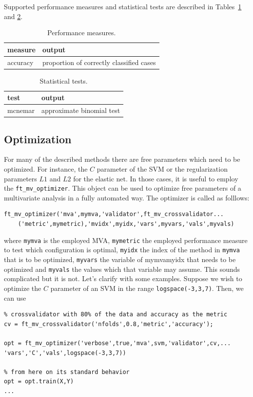 \documentclass{article}
\renewcommand{\t}[1]{{\tt #1}}
\begin{document}
Supported performance measures and statistical tests are described in Tables~\ref{measure} and \ref{test}.
\begin{table}[ht]
\centering
\caption{Performance measures.}
\begin{tabular}{p{}|p{}}
{\bf measure} & {\bf output}\\
\hline
accuracy &proportion of correctly classified cases
\end{tabular}
\label{measure}
\end{table}

\begin{table}[ht]
\centering
\caption{Statistical tests.}
\begin{tabular}{p{}|p{}}
{\bf test} & {\bf output}\\
\hline
mcnemar & approximate binomial test
\end{tabular}
\label{test}
\end{table}


\subsection{Optimization}

For many of the described methods there are free parameters which need to be optimized. For instance, the $C$ parameter of the SVM or  the regularization parameters $L1$ and $L2$ for the elastic net.  In those cases, it is useful to employ the \t{ft\_mv\_optimizer}.  This object can be used to optimize free parameters of a multivariate analysis in a fully automated way. The optimizer is called as folllows:
\begin{verbatim}
ft_mv_optimizer('mva',mymva,'validator',ft_mv_crossvalidator...
	('metric',mymetric),'mvidx',myidx,'vars',myvars,'vals',myvals)
\end{verbatim}
where \t{mymva} is the employed MVA, \t{mymetric} the employed performance measure to test which configuration is optimal, \t{myidx} the index of the method in \t{mymva} that is to be optimized, \t{myvars} the variable of mymva{myidx} that needs to be optimized and \t{myvals} the values which that variable may assume. This sounds complicated but it is not. Let's clarify with some examples. Suppose we wish to optimize the $C$ parameter of an SVM in the range \t{logspace(-3,3,7)}. Then, we can use 
\begin{verbatim}
% crossvalidator with 80% of the data and accuracy as the metric
cv = ft_mv_crossvalidator('nfolds',0.8,'metric','accuracy'); 

opt = ft_mv_optimizer('verbose',true,'mva',svm,'validator',cv,...
'vars','C','vals',logspace(-3,3,7))

% from here on its standard behavior
opt = opt.train(X,Y) 
...
\end{verbatim}
\end{document}
